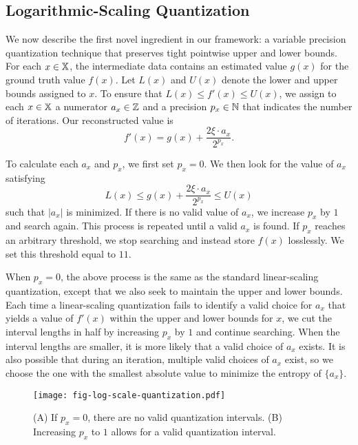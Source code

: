 \subsection{Logarithmic-Scaling Quantization}
\label{sec:augment-quantization}

We now describe the first novel ingredient in our framework: a variable precision quantization technique that preserves tight pointwise upper and lower bounds. %
For each $x \in \mathbb{X}$, the intermediate data contains an estimated value $g(x)$ for the ground truth value $f(x)$. 
Let $L(x)$ and $U(x)$ denote the lower and upper bounds assigned to $x$.
To ensure that $L(x) \leq f'(x) \leq U(x)$, we assign to each $x \in \mathbb{X}$ a numerator $a_x \in \mathbb{Z}$ and a precision $p_x \in \mathbb{N}$ that indicates the number of iterations. 
Our reconstructed value is 
\begin{equation}
f'(x) = g(x) + \frac{2\xi \cdot a_x}{2^{p_x}}.
\label{eq:fprime-original}
\end{equation}

To calculate each $a_x$ and $p_x$, we first set $p_x=0$. 
We then look for the value of $a_x$ satisfying 
\begin{equation*}
L(x) \leq g(x) + \frac{2\xi \cdot a_x}{2^{p_x}} \leq U(x)
\label{eq:Bounds}
\end{equation*}
such that $|a_x|$ is minimized. If there is no valid value of $a_x$, we increase $p_x$ by $1$ and search again. This process is repeated until a valid $a_x$ is found. If $p_x$ reaches an arbitrary threshold, we stop searching and instead store $f(x)$ losslessly. We set this threshold equal to $11$.

When $p_x = 0$, the above process is the same as the standard linear-scaling quantization, except that we also seek to maintain the upper and lower bounds. 
Each time a linear-scaling quantization fails to identify a valid choice for $a_x$ that yields a value of $f'(x)$ within the upper and lower bounds for $x$, we cut the interval lengths in half by increasing $p_x$ by $1$ and continue searching.
When the interval lengths are smaller, it is more likely that a valid choice of $a_x$ exists. 
It is also possible that during an iteration, multiple valid choices of $a_x$ exist, so we choose the one with the smallest absolute value to minimize the entropy of $\{a_x\}$. 

\begin{figure}[!ht]
    \centering
    \vspace{-2mm}
    \texttt{[image: fig-log-scale-quantization.pdf]}
    \vspace{-6mm}
    \caption{(A) If $p_x = 0$, there are no valid quantization intervals. (B) Increasing $p_x$ to $1$ allows for a valid quantization interval.}
    \label{fig:log-scale-quantization}
    \vspace{-2mm}
\end{figure}

